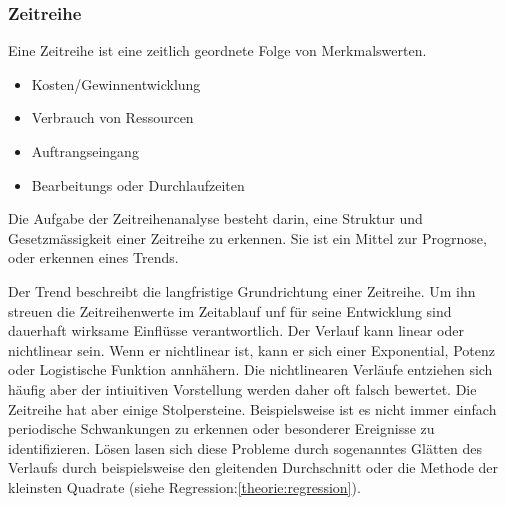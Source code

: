 \subsubsection{Zeitreihe}
\begin{tcolorbox}[colback=green!5,colframe=green!40!black, title=Zeitreihe]
Eine Zeitreihe ist eine zeitlich geordnete Folge von Merkmalswerten. 
\begin{itemize}
\item Kosten/Gewinnentwicklung
\item Verbrauch von Ressourcen
\item Auftrangseingang
\item Bearbeitungs oder Durchlaufzeiten
\end{itemize}
Die Aufgabe der Zeitreihenanalyse besteht darin, eine Struktur und Gesetzmässigkeit einer Zeitreihe zu erkennen. Sie ist ein Mittel zur Progrnose, oder erkennen eines Trends.
\end{tcolorbox}
Der Trend beschreibt die langfristige Grundrichtung einer Zeitreihe. Um ihn streuen die Zeitreihenwerte im Zeitablauf unf für seine Entwicklung sind dauerhaft wirksame Einflüsse verantwortlich. Der Verlauf kann linear oder nichtlinear sein. Wenn er nichtlinear ist, kann er sich einer Exponential, Potenz oder Logistische Funktion annhähern. Die nichtlinearen Verläufe entziehen sich häufig aber der intiuitiven Vorstellung werden daher oft falsch bewertet.
Die Zeitreihe hat aber einige Stolpersteine. Beispielsweise ist es nicht immer einfach periodische Schwankungen zu erkennen oder besonderer Ereignisse zu identifizieren. Lösen lasen sich diese Probleme durch sogenanntes Glätten des Verlaufs durch beispielsweise den gleitenden Durchschnitt oder die Methode der kleinsten Quadrate (siehe Regression:\autoref{theorie:regression}).